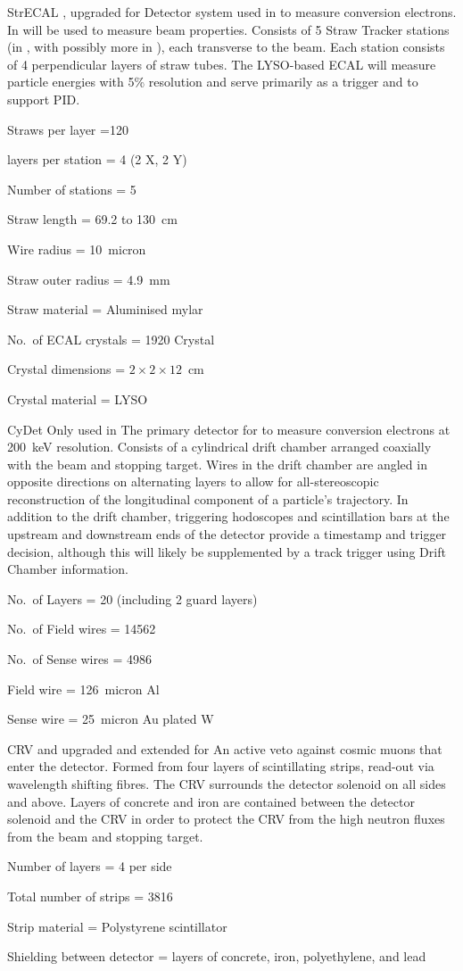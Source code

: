 {StrECAL}
{}
{\phaseI, upgraded for \phaseII}
{Detector system used in \phaseII to measure conversion electrons.
  In \phaseI will be used to measure beam properties.
  Consists of 5 Straw Tracker stations (in \phaseI, with possibly more in \phaseII), each transverse to the beam.
  Each station consists of 4 perpendicular layers of straw tubes.
  The LYSO-based ECAL will measure particle energies with 5\% resolution and serve primarily as a trigger and to support PID.}
{\item Straws per layer =120
 \item layers per station  = 4 (2 X, 2 Y)
 \item Number of stations = 5
 \item Straw length = 69.2 to 130~cm
 \item Wire radius = 10~micron
 \item Straw outer radius = 4.9~mm 
 \item Straw material = Aluminised mylar
 \item No.\ of ECAL crystals = 1920 Crystal
 \item Crystal dimensions = $2\times2\times12$~cm
 \item Crystal material = LYSO }

{CyDet}
{}
{Only used in \phaseI}
{The primary detector for \phaseI to measure conversion electrons at 200~keV resolution.
  Consists of a cylindrical drift chamber arranged coaxially with the beam and stopping target.
  Wires in the drift chamber are angled in opposite directions on alternating layers to allow for all-stereoscopic reconstruction of the longitudinal component of a particle's trajectory.
  In addition to the drift chamber, triggering hodoscopes and scintillation bars at the upstream and downstream ends of the detector provide a timestamp and trigger decision, although this will likely be supplemented by a track trigger using Drift Chamber information.}
{\item No.\ of Layers = 20 (including 2 guard layers)
 \item No.\ of Field wires = 14562
 \item No.\ of Sense wires = 4986
 \item Field wire = 126~micron Al
 \item Sense wire = 25~micron Au plated W }

{CRV}
{}
{\phaseI and upgraded and extended for \phaseII }
{An active veto against cosmic muons that enter the detector.  Formed from four layers of scintillating strips, read-out via wavelength shifting fibres.  The CRV surrounds the detector solenoid on all sides and above.  Layers of concrete and iron are contained between the detector solenoid and the CRV in order to protect the CRV from the high neutron fluxes from the beam and stopping target. }
{\item Number of layers = 4 per side
 \item Total number of strips = 3816  
 \item Strip material = Polystyrene scintillator 
 \item Shielding between detector = layers of concrete, iron, polyethylene, and lead }

